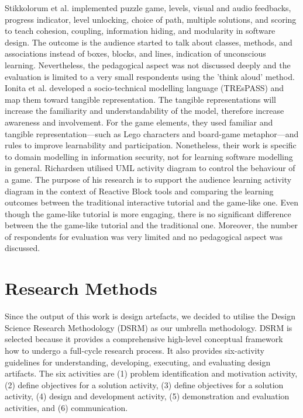 \documentclass[runningheads,a4paper]{llncs}
\begin{document}
Stikkolorum et al. \cite{Stikkolorum2014} implemented puzzle game, levels, visual and audio feedbacks, progress indicator, level unlocking, choice of path, multiple solutions, and scoring to teach cohesion, coupling, information hiding, and modularity in software design. The outcome is the audience started to talk about classes, methods, and associations instead of boxes, blocks, and lines, indication of unconscious learning. Nevertheless, the pedagogical aspect was not discussed deeply and the evaluation is limited to a very small respondents using the 'think aloud' method. Ionita et al. \cite{Ionita2015} developed a socio-technical modelling language (TREsPASS) and map them toward tangible representation. The tangible representations will increase the familiarity and understandability of the model, therefore increase awareness and involvement. For the game  elements, they used familiar and tangible representation---such as Lego characters and board-game metaphor---and rules to improve learnability and participation. Nonetheless, their work is specific to domain modelling in information security, not for learning software modelling in general. Richardsen \cite{Richardsen2014} utilised UML activity diagram to control the behaviour of a game. The purpose of his research is to support the audience learning activity diagram in the context of Reactive Block tools and comparing the learning outcomes between the traditional interactive tutorial and the game-like one. Even though the game-like tutorial is more engaging, there is no significant difference between the the game-like tutorial and the traditional one. Moreover, the number of respondents for evaluation was very limited and no pedagogical aspect was discussed.

\section{Research Methods}
Since the output of this work is design artefacts, we decided to utilise the Design Science Research Methodology (DSRM) \cite{peffers2007design} as our umbrella methodology. DSRM is selected because it provides a comprehensive high-level conceptual framework how to undergo a full-cycle research process. It also provides six-activity guidelines for understanding, developing, executing, and evaluating design artifacts. The six activities are (1) problem identification and motivation activity, (2) define objectives for a solution activity, (3) define objectives for a solution activity, (4) design and development activity, (5) demonstration and evaluation activities, and (6) communication. 
\end{document}

